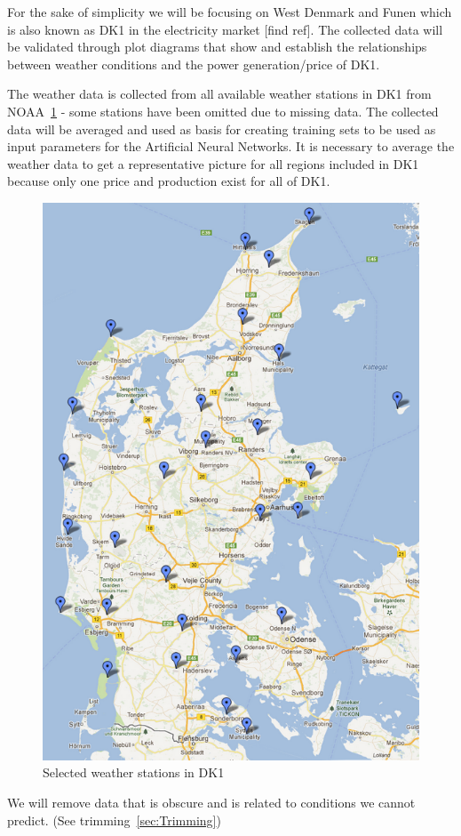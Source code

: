 For the sake of simplicity we will be focusing on West Denmark and Funen which is also known as DK1 in the electricity market [find ref]. The collected data will be validated through plot diagrams that show and establish the relationships between weather conditions and the power generation/price of DK1.

The weather data is collected from all available weather stations in DK1 from NOAA~\ref{fig:stations4average} - some stations have been omitted due to missing data. The collected data will be averaged and used as basis for creating training sets to be used as input parameters for the Artificial Neural Networks. It is necessary to average the weather data to get a representative picture for all regions included in DK1 because only one price and production exist for all of DK1.

\begin{figure}[H]
\centering
\includegraphics[width=0.85\linewidth,natwidth=898,natheight=587]{billeder/stations4average.png}
\caption{Selected weather stations in DK1}
\label{fig:stations4average}
\end{figure}


We will remove data that is obscure and is related to conditions we cannot predict. (See trimming~\ref{sec:Trimming})